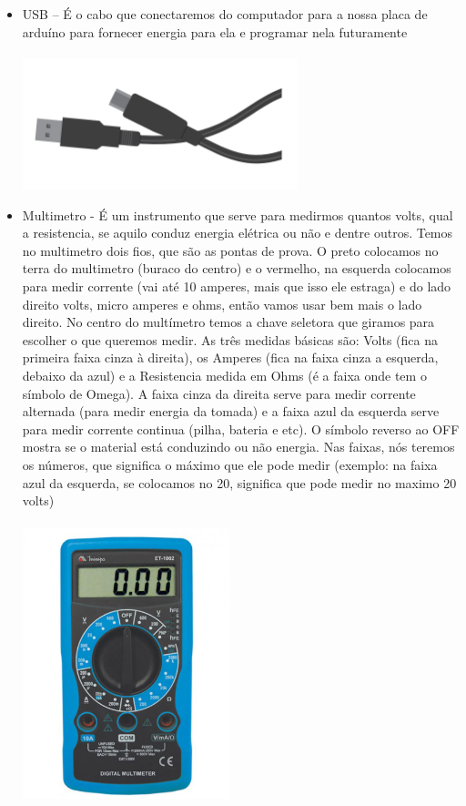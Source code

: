 \documentclass{report}
\begin{document}
\begin{itemize}
		\item USB – É o cabo que conectaremos do computador para a nossa placa de arduíno para fornecer energia para ela e programar nela futuramente  \\ \\
		\includegraphics[width=8cm]{imagens/usb.png}
		
		\item Multimetro - É um instrumento que serve para medirmos quantos volts, qual a resistencia, se aquilo conduz energia elétrica ou não e dentre outros. Temos no multimetro dois fios, que são as pontas de prova. O preto colocamos no terra do multimetro (buraco do centro) e o vermelho, na esquerda colocamos para medir corrente (vai até 10 amperes, mais que isso ele estraga) e do lado direito volts, micro amperes e ohms, então vamos usar bem mais o lado direito. No centro do multímetro temos a chave seletora que giramos para escolher o que queremos medir. As três medidas básicas são: Volts (fica na primeira faixa cinza à direita), os Amperes (fica na faixa cinza a esquerda, debaixo da azul) e a Resistencia medida em Ohms (é a faixa onde tem o símbolo de Omega). A faixa cinza da direita serve para medir corrente alternada (para medir energia da tomada) e a faixa azul da esquerda serve para medir corrente continua (pilha, bateria e etc). O símbolo reverso  ao OFF mostra se o material está conduzindo ou não energia. Nas faixas, nós teremos os números, que significa o máximo que ele pode medir (exemplo: na faixa azul da esquerda, se colocamos no 20, significa que pode medir no maximo 20 volts)\\ \\
		\includegraphics[width=6cm]{imagens/multimetro.png}
	\end{itemize}
	
\end{document}
